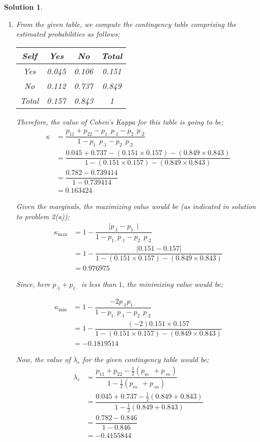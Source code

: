 \documentclass[12pt]{article}
\theoremstyle{problemstyle}
\newtheorem*{solution*}{Solution}
\begin{document}
\begin{solution*}
\begin{enumerate}
	
	\item[(c)] From the given table, we compute the contingency table comprising the estimated probabilities as follows;
	\begin{table}[H]
		\centering 
		\begin{tabular}{cccc}
			\toprule
			Self & Yes & No & Total\\
			\midrule 
			Yes & 0.045 & 0.106 & 0.151\\
			No & 0.112 & 0.737 & 0.849\\
			Total & 0.157 & 0.843 & 1\\
			\bottomrule
		\end{tabular}	
	\end{table}
	
	Therefore, the value of Cohen's Kappa for this table is going to be;
	\begin{align*}
		\kappa & = \dfrac{p_{11} + p_{22} - p_{1\cdot}p_{\cdot 1} - p_{2\cdot}p_{\cdot 2}}{1 - p_{1\cdot}p_{\cdot 1} - p_{2\cdot}p_{\cdot 2} }\\
		& = \dfrac{0.045 + 0.737 - (0.151\times 0.157) - (0.849\times 0.843)}{1 - (0.151\times 0.157) - (0.849\times 0.843) }\\
		& = \dfrac{0.782 - 0.739414}{1 - 0.739414}\\
		& = 0.163424
	\end{align*}
	
	Given the marginals, the maximizing value would be (as indicated in solution to problem 2(a)); 
	\begin{align*}
		\kappa_{\max} & = 1  - \dfrac{\vert p_{\cdot 1} - p_{1\cdot}\vert }{ 1 - p_{1\cdot}p_{\cdot 1} - p_{2\cdot}p_{\cdot 2} }\\
		& = 1 - \dfrac{\vert 0.151 - 0.157\vert}{1 - (0.151\times 0.157) - (0.849\times 0.843) }\\
		& = 0.976975
	\end{align*}
	
	Since, here $p_{\cdot 1} + p_{1 \cdot}$ is less than $1$, the minimizing value would be;
	
	\begin{align*}
	\kappa_{\min} & = 1  - \dfrac{-2p_{\cdot 1}p_{1\cdot}}{ 1 - p_{1\cdot}p_{\cdot 1} - p_{2\cdot}p_{\cdot 2} }\\
	& = 1 - \dfrac{(-2) 0.151 \times 0.157}{1 - (0.151\times 0.157) - (0.849\times 0.843)}\\
	& = -0.1819514
	\end{align*}
	
	Now, the value of $\lambda_r$ for the given contingency table would be;
	\begin{align*}
		\lambda_{r} & = \dfrac{p_{11} + p_{22} - \frac{1}{2}(p_{m\cdot} + p_{\cdot m})}{1 - \frac{1}{2}(p_{m\cdot} + p_{\cdot m})}\\
		& = \dfrac{0.045 + 0.737 - \frac{1}{2}(0.849 + 0.843)}{1 - \frac{1}{2}(0.849 + 0.843)}\\
		& = \dfrac{0.782 - 0.846}{1 - 0.846}\\
		& = -0.4155844
	\end{align*}
	

\end{enumerate}
\end{solution*}
\end{document}
